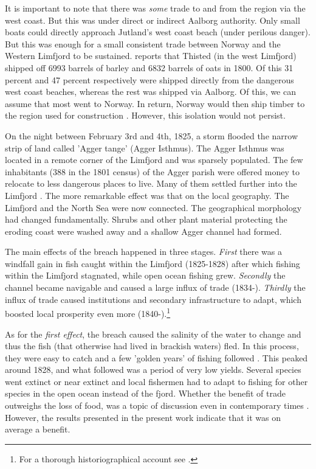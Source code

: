 \documentclass[11pt]{article}
\begin{document}
It is important to note that there was \textit{some} trade to and from the region via the west coast. But this was under direct or indirect Aalborg authority. Only small boats could directly approach Jutland's west coast beach (under perilous danger). But this was enough for a small consistent trade between Norway and the Western Limfjord to be sustained. \cite[p. 30]{Aagard1802} reports that Thisted (in the west Limfjord) shipped off 6993 barrels of barley and 6832 barrels of oats in 1800. Of this 31 percent and 47 percent respectively were shipped directly from the dangerous west coast beaches, whereas the rest was shipped via Aalborg. Of this, we can assume that most went to Norway. In return, Norway would then ship timber to the region used for construction \citep[p. 234]{Christensen1735}. However, this isolation would not persist.

On the night between February 3rd and 4th, 1825, a storm flooded the narrow strip of land called 'Agger tange' (Agger Isthmus). The Agger Isthmus was located in a remote corner of the Limfjord and was sparsely populated. The few inhabitants (388 in the 1801 census) of the Agger parish were offered money to relocate to less dangerous places to live. Many of them settled further into the Limfjord \citep{Poulsen2019, Poulsen2022}. The more remarkable effect was that on the local geography. The Limfjord and the North Sea were now connected. The geographical morphology had changed fundamentally. Shrubs and other plant material protecting the eroding coast were washed away and a shallow Agger channel had formed.

The main effects of the breach happened in three stages. \textit{First} there was a windfall gain in fish caught within the Limfjord (1825-1828) after which fishing within the Limfjord stagnated, while open ocean fishing grew. \textit{Secondly} the channel became navigable and caused a large influx of trade (1834-). \textit{Thirdly} the influx of trade caused institutions and secondary infrastructure to adapt, which boosted local prosperity even more (1840-).\footnote{For a thorough historiographical account see \cite{Poulsen2022}.}

As for the \textit{first effect}, the breach caused the salinity of the water to change and thus the fish (that otherwise had lived in brackish waters) fled. In this process, they were easy to catch and a few 'golden years' of fishing followed \citep{Poulsen2007}. This peaked around 1828, and what followed was a period of very low yields. Several species went extinct or near extinct \citep{Poulsen2019} and local fishermen had to adapt to fishing for other species in the open ocean instead of the fjord. Whether the benefit of trade outweighs the loss of food, was a topic of discussion even in contemporary times \citep[p. 1]{petersen1853oplysende}. However, the results presented in the present work indicate that it was on average a benefit.
\end{document}
